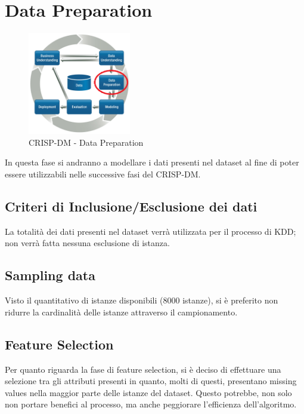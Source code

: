 \chapter{Data Preparation}

\begin{figure}[hbtp]
	\centering
	\includegraphics[width=0.4\textwidth]{./images/CRISPDM_3.png}
	\caption{CRISP-DM - Data Preparation}
	\label{CRISPDM_3}
\end{figure}
In questa fase si andranno a modellare i dati presenti nel dataset al fine di poter essere utilizzabili nelle successive fasi del CRISP-DM.
\section{Criteri di Inclusione/Esclusione dei dati}
La totalità dei dati presenti nel dataset verrà utilizzata per il processo di KDD; non verrà fatta nessuna esclusione di istanza.
\section{Sampling data}
Visto il quantitativo di istanze disponibili (8000 istanze), si è preferito non ridurre la cardinalità delle istanze attraverso il campionamento.
\section{Feature Selection}
\label{Feature Selection}
Per quanto riguarda la fase di feature selection, si è deciso di effettuare una selezione tra gli attributi presenti in quanto, molti di questi, presentano missing values nella maggior parte delle istanze del dataset. Questo potrebbe, non solo non portare benefici al processo, ma anche peggiorare l'efficienza dell'algoritmo.

